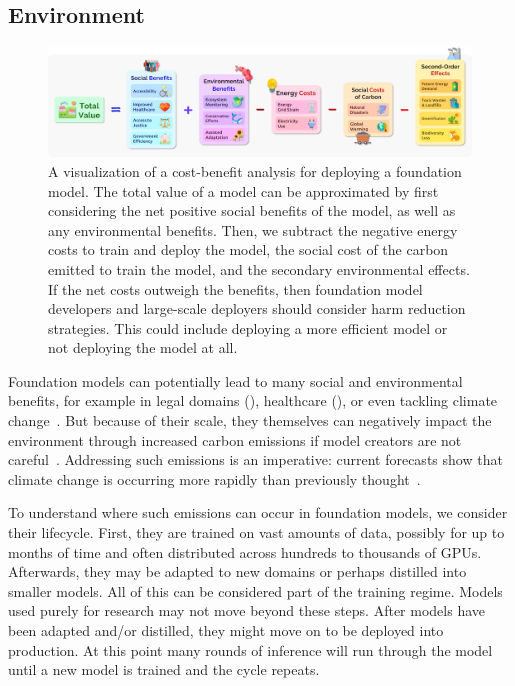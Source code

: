 \newsection
\subsection{Environment}
\label{sec:environment}

\begin{figure}[!ht]
\centering
\includegraphics[width=\linewidth]{society/figures/Environment_Equation.png}
\caption{\label{fig:environment} A visualization of a cost-benefit analysis for deploying a foundation model. The total value of a model can be approximated by first considering the net positive social benefits of the model, as well as any environmental benefits. Then, we subtract the negative energy costs to train and deploy the model, the social cost of the carbon emitted to train the model, and the secondary environmental effects. If the net costs outweigh the benefits, then foundation model developers and large-scale deployers should consider harm reduction strategies. This could include deploying a more efficient model or not deploying the model at all. }
\end{figure}

Foundation models can potentially lead to many social and environmental benefits, for example in legal domains (), healthcare (), or even tackling climate change~\citep{rolnick2019tackling}. But because of their scale, they themselves can negatively impact the environment through increased carbon emissions if model creators are not careful~\citep{strubell2019energy,lottick2019nergy,schwartz2019green,lacoste2019quantifying,cao2020towards,henderson2020towards,bender2021,patterson2021carbon,lannelongue2021green,parcollet2021energy}. Addressing such emissions is an imperative: current forecasts show that climate change is occurring more rapidly than previously thought~\citep{ipcc2021}.

To understand where such emissions can occur in foundation models, we consider their lifecycle. First, they are trained on vast amounts of data, possibly for up to months of time and often distributed across hundreds to thousands of GPUs. Afterwards, they may be adapted to new domains or perhaps distilled into smaller models. All of this can be considered part of the training regime. Models used purely for research may not move beyond these steps. 
After models have been adapted and/or distilled, they might move on to be deployed into production. At this point many rounds of inference will run through the model until a new model is trained and the cycle repeats. 

